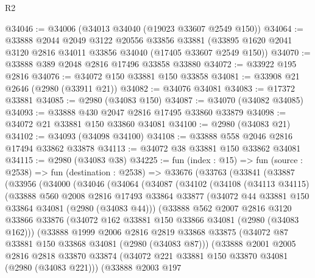 \begin{lexlean}{R2}
\begin{coremodule}
@34046 := @34006 (@34013 @34040 (@19023 @33607 @2549 @150))
@34064 := @33888
    @2044
    @2049
    @3122
    @20556
    @33856
    @33881
    (@33895 @1620 @2041 @3120 @2816 @34011 @33856 @34040 (@17405 @33607 @2549 @150))
@34070 := @33888 @389 @2048 @2816 @17496 @33858 @33880
@34072 := @33922 @195 @2816
@34076 := @34072 @150 @33881 @150 @33858
@34081 := @33908 @21 @2646 (@2980 (@33911 @21))
@34082 := @34076 @34081
@34083 := @17372 @33881
@34085 := @2980 (@34083 @150)
@34087 := @34070 (@34082 @34085)
@34093 := @33888 @430 @2047 @2816 @17495 @33860 @33879
@34098 := @34072 @21 @33881 @150 @33860 @34081
@34100 := @2980 (@34083 @21)
@34102 := @34093 (@34098 @34100)
@34108 := @33888 @558 @2046 @2816 @17494 @33862 @33878
@34113 := @34072 @38 @33881 @150 @33862 @34081
@34115 := @2980 (@34083 @38)
@34225 := fun (index : @15) =>
  fun (source : @2538) =>
  fun (destination : @2538) =>
  @33676
    (@33763
      (@33841
        (@33887
          (@33956
            (@34000
              (@34046
                (@34064
                  (@34087
                    (@34102
                      (@34108
                        (@34113 @34115)
                        (@33888
                          @560
                          @2008
                          @2816
                          @17493
                          @33864
                          @33877
                          (@34072 @44 @33881 @150 @33864 @34081 (@2980 (@34083 @44)))
                          (@33888
                            @562
                            @2007
                            @2816
                            @3120
                            @33866
                            @33876
                            (@34072 @162 @33881 @150 @33866 @34081 (@2980 (@34083 @162)))
                            (@33888
                              @1999
                              @2006
                              @2816
                              @2819
                              @33868
                              @33875
                              (@34072 @87 @33881 @150 @33868 @34081 (@2980 (@34083 @87)))
                              (@33888
                                @2001
                                @2005
                                @2816
                                @2818
                                @33870
                                @33874
                                (@34072 @221 @33881 @150 @33870 @34081 (@2980 (@34083 @221)))
                                (@33888
                                  @2003
                                  @197

\end{coremodule}
\end{lexlean}
